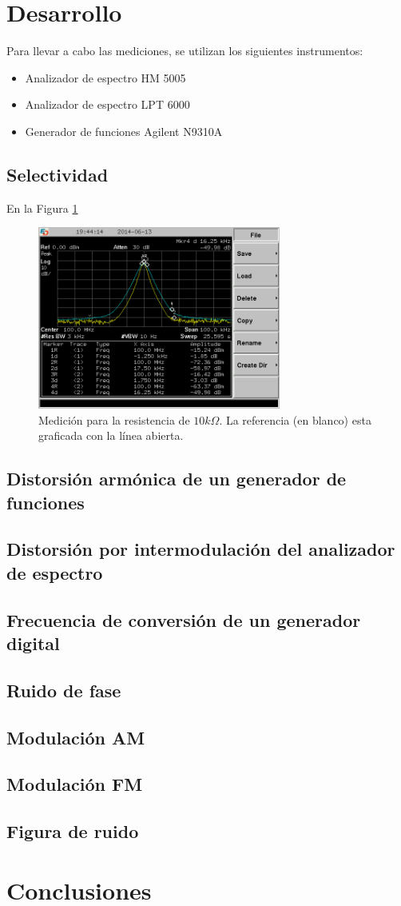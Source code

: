 \documentclass[a4paper,10pt]{article}
\begin{document}
	\section{Desarrollo}
\indent Para llevar a cabo las mediciones, se utilizan los siguientes
		instrumentos:
		\begin{itemize}
			\item Analizador de espectro HM 5005
			\item Analizador de espectro LPT 6000
			\item Generador de funciones Agilent N9310A
		\end{itemize}	
	
		\subsection{Selectividad}
		\indent En la Figura \ref{img001}
	
		
		\begin{figure}[!htb]
				\centering
				\includegraphics[width=8cm]
				{Imagenes/SCREN443.PNG}
				\caption{Medici\'on para la resistencia de $10k\Omega$. La 
				referencia (en blanco) esta graficada con la l\'inea abierta.}
				\label{img001} 
		\end{figure}
		\subsection{Distorsi\'on arm\'onica de un generador de funciones}	
		\subsection{Distorsi\'on por intermodulaci\'on del analizador de espectro}
		\subsection{Frecuencia de conversi\'on de un generador digital}
		\subsection{Ruido de fase}
		\subsection{Modulaci\'on AM}
		\subsection{Modulaci\'on FM}
		\subsection{Figura de ruido}
	\section{Conclusiones}
	\indent
\end{document}
